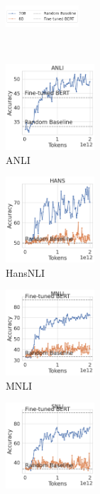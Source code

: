 \begin{figure}[t]
    \begin{subfigure}[b]{\textwidth}
        \includegraphics[width=0.3\textwidth]{figures/training_legend}
        \vspace{-2mm}
    \end{subfigure}\\
    \begin{subfigure}[b]{0.20\textwidth}
    \centering
    \includegraphics[height=3.2cm]{figures/anli_intermediate}
    \caption{ANLI}
    \end{subfigure}
    \label{fig:anli}
    \begin{subfigure}[b]{0.19\textwidth}
    \centering
    \includegraphics[height=3.2cm, trim=11mm 0 0 0, clip]{figures/hansnli_intermediate}
    \caption{HansNLI}
    \label{fig:hansnli}
    \end{subfigure}
    \begin{subfigure}[b]{0.19\textwidth}
    \centering
    \includegraphics[height=3.2cm, trim=11mm 0 0 0, clip]{figures/mnli_matched_intermediate}
    \caption{MNLI}
    \label{fig:mnli}
    \end{subfigure}
    \begin{subfigure}[b]{0.19\textwidth}
    \centering
    \includegraphics[height=3.2cm, trim=11mm 0 0 0, clip]{figures/snli_intermediate}

\end{subfigure}
\end{figure}
